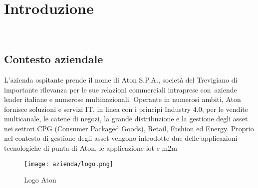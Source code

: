 
\chapter{Introduzione}
\label{cap:introduzione}

\\





\section{Contesto aziendale}

L'azienda ospitante prende il nome di Aton S.P.A., società del Trevigiano di importante rilevanza per le sue relazioni commerciali intraprese con\
aziende leader italiane e numerose multinazionali.
Operante in numerosi ambiti, Aton fornisce soluzioni e servizi IT, in linea con i principi Industry 4.0, per le vendite multicanale, le catene di negozi, 
la grande distribuzione e la gestione degli asset nei settori CPG (Consumer Packaged Goods), Retail, Fashion ed Energy.
Proprio nel contesto di gestione degli asset vengono introdotte due delle applicazioni tecnologiche di punta di Aton, le applicazione \gls{iot} e \gls{m2m}

\begin{figure}[!h] 
    \centering 
    \texttt{[image: azienda/logo.png]} 
    \caption{Logo Aton}
\end{figure}

